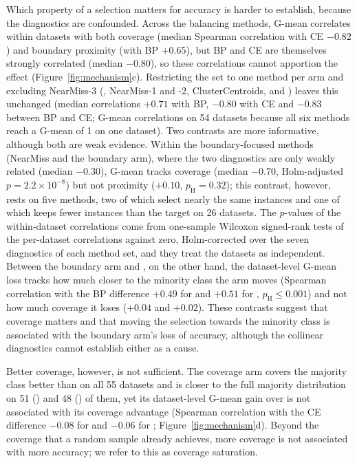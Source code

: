 Which property of a selection matters for accuracy is harder to establish, because the diagnostics are confounded. Across the balancing methods, G-mean correlates within datasets with both coverage (median Spearman correlation with CE $-0.82$) and boundary proximity (with BP $+0.65$), but BP and CE are themselves strongly correlated (median $-0.80$), so these correlations cannot apportion the effect (Figure~\ref{fig:mechanism}c). Restricting the set to one method per arm and excluding NearMiss-3 (\RUS, NearMiss-1 and -2, ClusterCentroids, \MUSBS{} and \MUSCS) leaves this unchanged (median correlations $+0.71$ with BP, $-0.80$ with CE and $-0.83$ between BP and CE; G-mean correlations on 54 datasets because all six methods reach a G-mean of 1 on one dataset). Two contrasts are more informative, although both are weak evidence. Within the boundary-focused methods (NearMiss and the boundary arm), where the two diagnostics are only weakly related (median $-0.30$), G-mean tracks coverage (median $-0.70$, Holm-adjusted $p=2.2\times10^{-8}$) but not proximity ($+0.10$, $p_\mathrm{H}=0.32$); this contrast, however, rests on five methods, two of which select nearly the same instances and one of which keeps fewer instances than the target on 26 datasets. The $p$-values of the within-dataset correlations come from one-sample Wilcoxon signed-rank tests of the per-dataset correlations against zero, Holm-corrected over the seven diagnostics of each method set, and they treat the datasets as independent. Between the boundary arm and \RUS, on the other hand, the dataset-level G-mean loss tracks how much closer to the minority class the arm moves (Spearman correlation with the BP difference $+0.49$ for \MUSBS{} and $+0.51$ for \MUSBO, $p_\mathrm{H}\le0.001$) and not how much coverage it loses ($+0.04$ and $+0.02$). These contrasts suggest that coverage matters and that moving the selection towards the minority class is associated with the boundary arm's loss of accuracy, although the collinear diagnostics cannot establish either as a cause.

Better coverage, however, is not sufficient. The coverage arm covers the majority class better than \RUS{} on all 55 datasets and is closer to the full majority distribution on 51 (\MUSCS) and 48 (\MUSCO) of them, yet its dataset-level G-mean gain over \RUS{} is not associated with its coverage advantage (Spearman correlation with the CE difference $-0.08$ for \MUSCS{} and $-0.06$ for \MUSCO; Figure~\ref{fig:mechanism}d). Beyond the coverage that a random sample already achieves, more coverage is not associated with more accuracy; we refer to this as coverage saturation.

